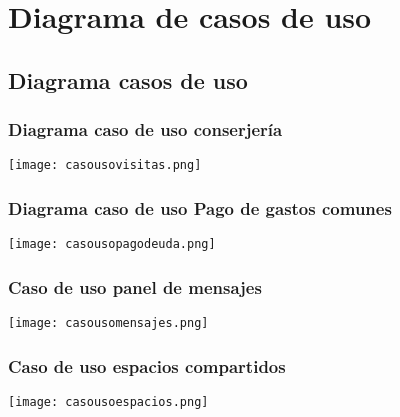 \chapter{Diagrama de casos de uso}
\section{Diagrama casos de uso}
\subsection{Diagrama caso de uso conserjería}
\texttt{[image: casousovisitas.png]}
\subsection{Diagrama caso de uso Pago de gastos comunes}
\texttt{[image: casousopagodeuda.png]} 
\subsection{Caso de uso panel de mensajes}
\texttt{[image: casousomensajes.png]}
\subsection{Caso de uso espacios compartidos}
\texttt{[image: casousoespacios.png]}